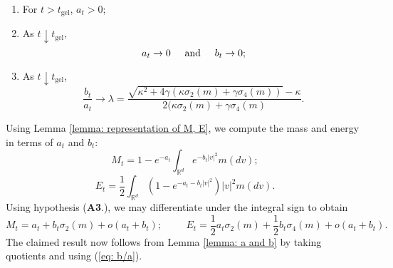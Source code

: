 \begin{lemma}
\begin{enumerate}[label=\roman{*}).]
    \item For $t>t_\text{gel}$, $a_t>0$;
    \item As $t\downarrow t_\text{gel}$, \begin{equation}
        a_t \rightarrow 0 \hspace{0.5cm} \text{and} \hspace{0.5cm} b_t\rightarrow 0;
    \end{equation}
    \item As $t\downarrow t_\text{gel}$, \begin{equation} \label{eq: b/a}
        \frac{b_t}{a_t}\rightarrow\lambda= \frac{\sqrt{\kappa^2+4\gamma(\kappa\sigma_2(m)+\gamma \sigma_4(m))}-\kappa}{2(\kappa\sigma_2(m)+\gamma\sigma_4(m)}.
    \end{equation}
\end{enumerate}  \end{lemma}  Using Lemma \ref{lemma: representation of M, E}, we compute the mass and energy in terms of $a_t$ and $b_t$:\begin{equation}
    M_t=1-e^{-a_t}\int_{\mathbb{R}^d} e^{-b_t|v|^2}m(dv);
\end{equation}\begin{equation}
    E_t=\frac{1}{2}\int_{\mathbb{R}^d}\left(1-e^{-a_t-b_t|v|^2}\right)|v|^2m(dv).
\end{equation} Using hypothesis (\textbf{A3}.), we may differentiate under the integral sign to obtain \begin{equation}
    M_t=a_t+b_t\sigma_2(m)+o(a_t+b_t); \hspace{1cm} E_t=\frac{1}{2}a_t\sigma_2(m)+\frac{1}{2}b_t\sigma_4(m)+o(a_t+b_t).
\end{equation} The claimed result now follows from Lemma \ref{lemma: a and b} by taking quotients and using (\ref{eq: b/a}). 

